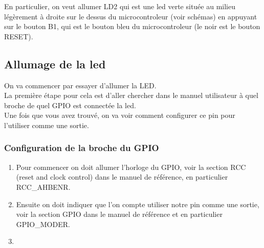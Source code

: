 \documentclass[a4paper,10pt]{article} %
\begin{document}
En particulier, on veut allumer LD2 qui est une led verte située au milieu légèrement à droite sur le dessus du microcontroleur (voir schémas) en appuyant sur le bouton B1, qui est le bouton bleu du microcontroleur (le noir est le bouton RESET).\\

\subsection{Allumage de la led}
On va commencer par essayer d'allumer la LED.\\

La première étape pour cela est d'aller chercher dans le manuel utilisateur à quel broche de quel GPIO est connectée la led.\\

Une fois que vous avez trouvé, on va voir comment configurer ce pin pour l'utiliser comme une sortie.

\subsubsection{Configuration de la broche du GPIO}
\begin{enumerate}
\item Pour commencer on doit allumer l'horloge du GPIO, voir la section RCC (reset and clock control) dans le manuel de référence, en particulier RCC\_AHBENR.
\item Ensuite on doit indiquer que l'on compte utiliser notre pin comme une sortie, voir la section GPIO dans le manuel de référence et en particulier GPIO\_MODER.
\item
\end{enumerate}
\end{document}
